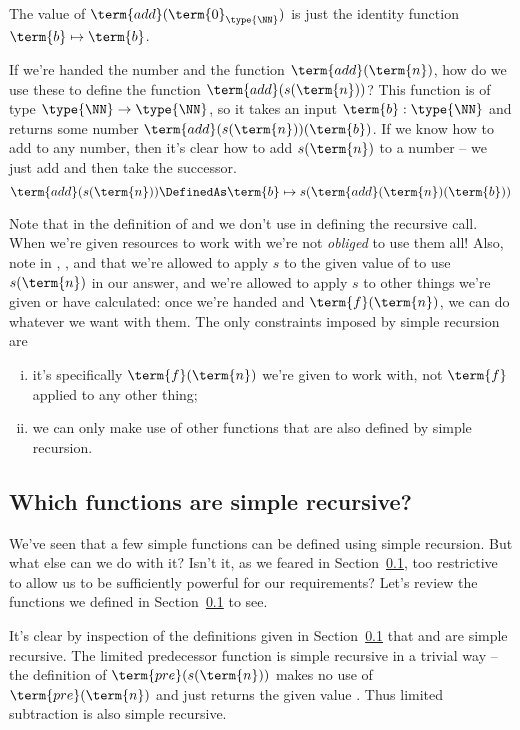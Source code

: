 \begin{description}
The value of $\term{add}(\term{0}_{\type{\NN}})$ is just the identity function $\term{b} \mapsto \term{b}$.  

If we're handed the number  and the function $\term{add}(\term{n})$, how do we use these to define the function $\term{add}(s(\term{n}))$?  This function is of type $\type{\NN} \to \type{\NN}$, so it takes an input $\term{b}:\type{\NN}$ and returns some number $\term{add}(s(\term{n}))(\term{b})$.  If we know how to add  to any number, then it's clear how to add $s(\term{n})$ to a number -- we just add  and then take the successor.  
\[
\term{add}(s(\term{n})) \DefinedAs
\term{b} \mapsto s(\term{add}(\term{n})(\term{b}))
\]
\end{description}

Note that in the definition of  and  we don't use  in defining the recursive call.  When we're given resources to work with we're not \emph{obliged} to use them all!  Also, note in , , and  that we're allowed to apply $s$ to the given value of  to use $s(\term{n})$ in our answer, and we're allowed to apply $s$ to other things we're given or have calculated: once we're handed  and $\term{f}(\term{n})$, we can do whatever we want with them.  The only constraints imposed by simple recursion are
\begin{enumerate}[(i)]
\item it's specifically $\term{f}(\term{n})$ we're given to work with, not $\term{f}$ applied to any other thing;
\item we can only make use of other functions that are also defined by simple recursion.
\end{enumerate}


\subsection{Which functions are simple recursive?}

We've seen that a few simple functions can be defined using simple recursion.  But what else can we do with it?  Isn't it, as we feared in Section~\ref{}, too restrictive to allow us to be sufficiently powerful for our requirements?  Let's review the functions we defined in Section~\ref{} to see.

It's clear by inspection of the definitions given in Section~\ref{} that  and  are simple recursive.  The limited predecessor function  is simple recursive in a trivial way -- 
the definition of $\term{pre}(s(\term{n}))$ 
makes no use of $\term{pre}(\term{n})$ and just returns the given value .  Thus limited subtraction is also simple recursive.

